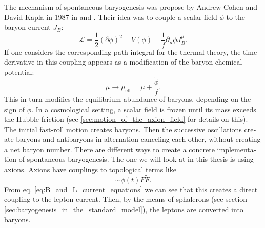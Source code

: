 \documentclass[master,       %
               twoside,        %
               BCOR10mm,       %
               english,ngerman, %
               ]{GAUBM}
\begin{document}
\begin{otherlanguage}{english}
The mechanism of spontaneous baryogenesis was propose by Andrew Cohen and David Kapla in 1987 in \cite{COHEN1987251} and \cite{COHEN1988913}.
Their idea was to couple a scalar field $\phi$ to the baryon current $J_B$:
\begin{equation}
	\mathcal{L} = \frac{1}{2} (\partial \phi)^2 - V(\phi) - \frac{1}{f} \partial_\mu \phi J_B^\mu.
\end{equation}
If one considers the corresponding path-integral for the thermal theory, the time derivative in this coupling appears as a modification of the baryon chemical potential:
\begin{equation}
	\mu \to \mu_\mathrm{eff} = \mu + \frac{\dot{\phi}}{f}.
\end{equation}
This in turn modifies the equilibrium abundance of baryons, depending on the sign of $\dot{\phi}$.
In a cosmological setting, a scalar field is frozen until its mass exceeds the Hubble-friction (see \ref{sec:motion_of_the_axion_field} for details on this). The initial fast-roll motion creates baryons. Then the successive oscillations create baryons and antibaryons in alternation canceling each other, without creating a net baryon number.
There are different ways to create a concrete implementation of spontaneous baryogenesis.
The one we will look at in this thesis is using axions.
Axions have couplings to topological terms like
\begin{equation}
	 \sim \phi(t) F \tilde{F}.
\end{equation}
From eq. \eqref{eq:B_and_L_current_equations} we can see that this creates a direct coupling to the lepton current.
Then, by the means of sphalerons (see section \ref{sec:baryogenesis_in_the_standard_model}), the leptons are converted into baryons.


\end{otherlanguage}
\end{document}
